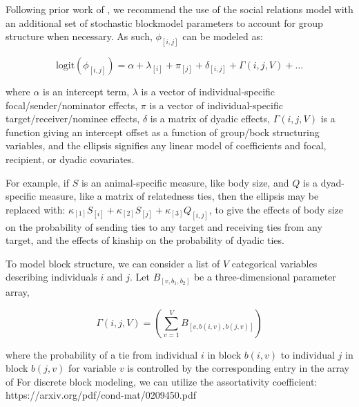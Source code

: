 \documentclass[Afour,sageh,times]{sagej}
\begin{document}
Following prior work of \citet{redhead2021reliable, ross2022modelling}, we recommend the use of the social relations model \citep{kenny1984social, snijders1999social, back2010social} with an additional set of stochastic blockmodel parameters \citep{holland1983stochastic, karrer2011stochastic, peixoto2019bayesian} to account for group structure when necessary. As such, $\phi_{[i,j]}$ can be modeled as:
\begin{ceqn}
\begin{equation}\label{link}
\text{logit}(\phi_{[i,j]}) = \alpha + \lambda_{[i]} + \pi_{[j]} + \delta_{[i,j]} + \Gamma(i,j,V) + \ldots 
\end{equation}
\end{ceqn}
where $\alpha$ is an intercept term, $\lambda$ is a vector of individual-specific focal/sender/nominator effects, $\pi$ is a vector of individual-specific target/receiver/nominee effects, $\delta$ is a matrix of dyadic effects, $\Gamma(i,j,V)$ is a function giving an intercept offset as a function of group/bock structuring variables, and the ellipsis signifies any linear model of coefficients and focal, recipient, or dyadic covariates. 

For example, if $S$ is an animal-specific measure, like body size, and $Q$ is a dyad-specific measure, like a matrix of relatedness ties, then the ellipsis  may be replaced with:  $\kappa_{[1]}S_{[i]} + \kappa_{[2]}S_{[j]} + \kappa_{[3]}Q_{[i,j]}$, to give the effects of body size on the probability of sending ties to any target and receiving ties from any target, and the effects of kinship on the probability of dyadic ties.

To model block structure, we can consider a list of $V$ categorical variables describing individuals $i$ and $j$. Let $B_{[v,b_1,b_2]}$ be a three-dimensional parameter array, %
\begin{ceqn}
\begin{equation}\label{link}
\Gamma(i,j,V) = \left(\sum_{v=1}^{V} B_{[v,b(i,v),b(j,v)]} \right)
\end{equation}
\end{ceqn}
where the probability of a tie from individual $i$ in block $b(i,v)$ to individual $j$ in block $b(j,v)$ for variable $v$ is controlled by the corresponding entry in the array of %
 For discrete block modeling, we can utilize the assortativity coefficient: https://arxiv.org/pdf/cond-mat/0209450.pdf
\end{document}

